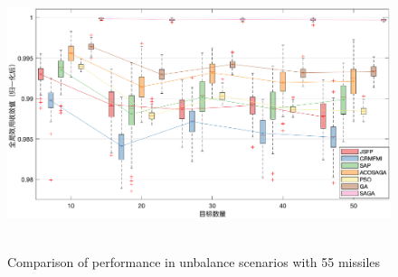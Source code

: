 \begin{figure}[!htp]
  \centering
  \includegraphics[height=8cm]{potential_game/BoxM55T10-50}
    {Comparison of performance in unbalance scenarios with 55 missiles}
  \label{fig:unbalance}
\end{figure}





